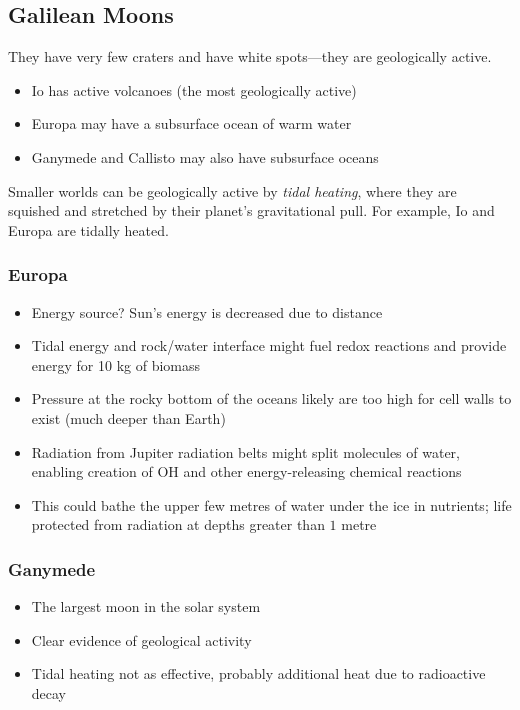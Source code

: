 \documentclass[class=article, crop=false]{standalone}
\begin{document}
  \subsection{Galilean Moons}
  \begin{note}{}
    They have very few craters and have white spots---they are geologically active.
  \end{note}
  \begin{itemize}
    \item Io has active volcanoes (the most geologically active)
    \item Europa may have a subsurface ocean of warm water
    \item Ganymede and Callisto may also have subsurface oceans
  \end{itemize}
  Smaller worlds can be geologically active by \emph{tidal heating}, where they are squished and stretched by their planet's gravitational pull. For example, Io and Europa are tidally heated.
  \subsubsection{Europa}
  \begin{itemize}
    \item Energy source? Sun's energy is decreased due to distance
    \item Tidal energy and rock/water interface might fuel redox reactions and provide energy for 10 kg of biomass
    \item Pressure at the rocky bottom of the oceans likely are too high for cell walls to exist (much deeper than Earth)
    \item Radiation from Jupiter radiation belts might split molecules of water, enabling creation of OH and other energy-releasing chemical reactions
    \item This could bathe the upper few metres of water under the ice in nutrients; life protected from radiation at depths greater than $1$ metre
  \end{itemize}
  \subsubsection{Ganymede}
  \begin{itemize}
    \item The largest moon in the solar system
    \item Clear evidence of geological activity
    \item Tidal heating not as effective, probably additional heat due to radioactive decay
  \end{itemize}
\end{document}
